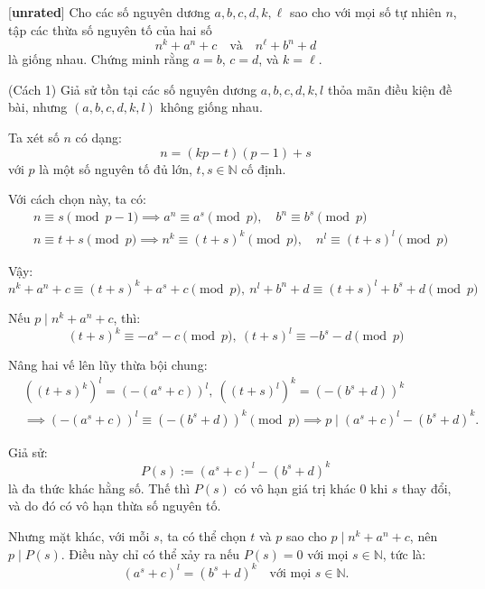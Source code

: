 \documentclass[../02-modular-arithmetic-b.tex]{subfiles}
\begin{document}
\begin{example*}\label{example:IRN-2015-N4}[\textbf{unrated}]
	Cho các số nguyên dương \( a, b, c, d, k, \ell \) sao cho với mọi số tự nhiên \( n \), tập các thừa số nguyên tố của hai số
	\[
		n^k + a^n + c \quad \text{và} \quad n^\ell + b^n + d
	\]
	là giống nhau. Chứng minh rằng \( a = b \), \( c = d \), và \( k = \ell \).
\end{example*}

\begin{soln}(Cách 1)\footnotemark
	Giả sử tồn tại các số nguyên dương \( a, b, c, d, k, l \) thỏa mãn điều kiện đề bài, nhưng \( (a, b, c, d, k, l) \) không giống nhau.

	Ta xét số \( n \) có dạng:
	\[
		n = (kp - t)(p - 1) + s
	\]
	với \( p \) là một số nguyên tố đủ lớn, \( t, s \in \mathbb{N} \) cố định.
	
	Với cách chọn này, ta có:
	\[
		\begin{aligned}
			&n \equiv s \pmod{p - 1} \implies a^n \equiv a^s \pmod{p}, \quad b^n \equiv b^s \pmod{p}\\
			&n \equiv t + s \pmod{p} \implies n^k \equiv (t + s)^k \pmod{p}, \quad n^l \equiv (t + s)^l \pmod{p}
		\end{aligned}
	\]

	Vậy:
	\[
		n^k + a^n + c \equiv (t + s)^k + a^s + c \pmod{p},\ n^l + b^n + d \equiv (t + s)^l + b^s + d \pmod{p}
	\]
	
	Nếu \( p \mid n^k + a^n + c \), thì:
	\[
		(t + s)^k \equiv -a^s - c \pmod{p},\ (t + s)^l \equiv -b^s - d \pmod{p}
	\]
	
	Nâng hai vế lên lũy thừa bội chung:
	\[
		\begin{aligned}
			&((t + s)^k)^l = (-(a^s + c))^l,\ ((t + s)^l)^k = (-(b^s + d))^k\\
			&\implies (-(a^s + c))^l \equiv (-(b^s + d))^k \pmod{p} \implies p \mid (a^s + c)^l - (b^s + d)^k.
		\end{aligned}
	\]
	
	Giả sử:
	\[
		P(s) := (a^s + c)^l - (b^s + d)^k
	\]
	là đa thức khác hằng số. Thế thì \( P(s) \) có vô hạn giá trị khác 0 khi \( s \) thay đổi, và do đó có vô hạn thừa số nguyên tố.
	
	Nhưng mặt khác, với mỗi \( s \), ta có thể chọn \( t \) và \( p \) sao cho \( p \mid n^k + a^n + c \), nên \( p \mid P(s) \).
	Điều này chỉ có thể xảy ra nếu \( P(s) = 0 \) với mọi \( s \in \mathbb{N} \), tức là:
	\[
		(a^s + c)^l = (b^s + d)^k \quad \text{với mọi } s \in \mathbb{N}.
	\]
	

\end{soln}
\end{document}
